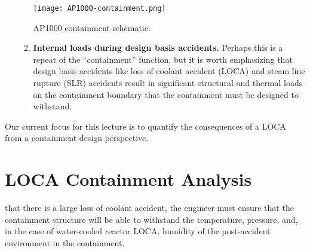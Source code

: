 \begin{itemize}
\begin{enumerate}
\begin{marginfigure}
\texttt{[image: AP1000-containment.png]}
\caption{AP1000 containment schematic.}
\label{fig:AP1000-containment}
\end{marginfigure}

\item \textbf{Internal loads during design basis accidents.}  Perhaps this is a repeat of the ``containment'' function, but it is worth emphasizing that design basis accidents like loss of coolant accident (LOCA) and steam line rupture (SLR) accidents result in significant structural and thermal loads on the containment boundary that the containment must be designed to withstand.
\end{enumerate}
\end{itemize}  
Our current focus for this lecture is to quantify the consequences of a LOCA from a containment design perspective.

\section{LOCA Containment Analysis}
 that there is a large loss of coolant accident, the engineer must ensure that the containment structure will be able to withstand the temperature, pressure, and, in the case of water-cooled reactor LOCA, humidity of the post-accident environment in the containment.

